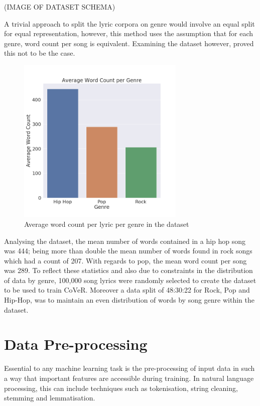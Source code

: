 \noindent
\newline
(IMAGE OF DATASET SCHEMA)

\noindent
\newline
A trivial approach to split the lyric corpora on genre would involve an equal split for equal representation, however, this method uses the assumption that for each genre, word count per song is equivalent. Examining the dataset however, proved this not to be the case.
\begin{figure}[h]
	\includegraphics[width=8cm, height=8cm]{./figures/fig6}
	\centering
	\caption{Average word count per lyric per genre in the dataset}
	\label{fig:fig6}
\end{figure}

\noindent
\newline
Analysing the dataset, the mean number of words contained in a hip hop song was 444; being more than double the mean number of words found in rock songs which had a count of 207. With regards to pop, the mean word count per song was 289. To reflect these statistics and also due to constraints in the distribution of data by genre, 100,000 song lyrics were randomly selected to create the dataset to be used to train CoVeR. Moreover a data split of 48:30:22 for Rock, Pop and Hip-Hop, was to maintain an even distribution of words by song genre within the dataset.
\section{Data Pre-processing}
Essential to any machine learning task is the pre-processing of input data in such a way that important features are accessible during training. In natural language processing, this can include techniques such as tokenisation, string cleaning, stemming and lemmatisation.


